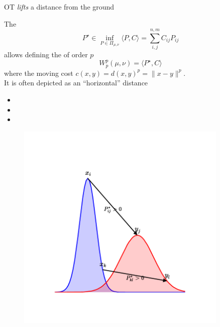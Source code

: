 \documentclass[pdf,aspectratio=169,10pt]{beamer}
\begin{document}
\begin{frame}{OT \emph{lifts} a distance from the ground}
    \\
    \begin{minipage}{0.59\textwidth}
        The 
        \begin{equation*}
            P^\star \in \inf_{P\in\Pi_{\mu,\nu}} \langle P , C\rangle = \sum_{i,j}^{n,m} C_{ij}P_{ij} 
        \end{equation*}
        allows defining the  of order $p$
        \begin{equation*}
            W^p_p(\mu, \nu) =  \langle P^\star , C\rangle
        \end{equation*}
        where the moving cost $c(x, y) = {d(x, y)}^p = \| x - y \|^p$.\\
        It is often depicted as an ``horizontal'' distance
\begin{itemize}
          \item[\bred{$\checkmark$}] 
          \item[\bred{$\checkmark$}]  
          \item[\bred{$\checkmark$}] 
      \end{itemize}       
    \end{minipage}
    \hfill
    \begin{minipage}{0.4\textwidth}
    \begin{figure}
        \centering
            \includegraphics[trim={2cm 2cm 2cm 2cm},clip, width=0.9\textwidth]{../img/horizontal_distance.pdf}
        \end{figure}
        \centering
        \small
    \end{minipage}
    

\end{frame}
\end{document}
